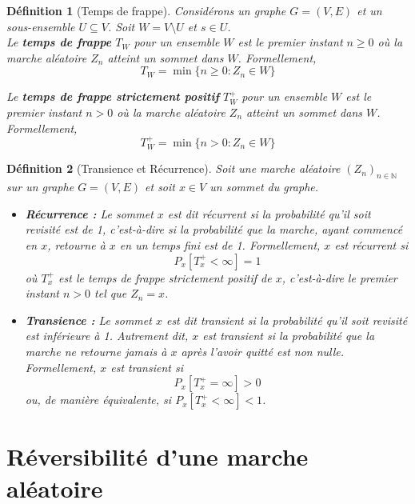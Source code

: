 \documentclass{article}
\theoremstyle{pasdepoint}
\newtheorem{definition}{Définition}
\theoremstyle{break}
\theoremstyle{pasdepoint}
\begin{document}
\begin{definition}[Temps de frappe]
    Considérons un graphe \( G = (V, E) \) et un sous-ensemble \( U \subseteq V \). Soit \( W = V \setminus U \) et \( s \in U \).\\

    Le \textbf{temps de frappe} \( T_W \) pour un ensemble \( W \) est le premier instant \( n \geq 0 \) où la marche aléatoire \( Z_n \) atteint un sommet dans \( W \). Formellement, 
    \[
    T_W = \min\{n \geq 0 : Z_n \in W\}
    \]

    Le \textbf{temps de frappe strictement positif} \(T_W^+\) pour un ensemble \( W \) est le premier instant \( n > 0 \) où la marche aléatoire \( Z_n \) atteint un sommet dans \( W \). Formellement,
    \[
    T_W^+ = \min\{n > 0 : Z_n \in W\}
    \]
\end{definition}

\begin{definition}[Transience et Récurrence]
    Soit une marche aléatoire \( (Z_n)_{n \in \mathbb{N}} \) sur un graphe \( G = (V, E) \) et soit \( x \in V \) un sommet du graphe. 
    
    \begin{itemize}
        \item \textbf{Récurrence :} Le sommet \( x \) est dit \textit{récurrent} si la probabilité qu'il soit revisité est de 1, c'est-à-dire si la probabilité que la marche, ayant commencé en \( x \), retourne à \( x \) en un temps fini est de 1. Formellement, \( x \) est récurrent si
        \[
        P_x[T_x^+ < \infty] = 1
        \]
        où \( T_x^+ \) est le temps de frappe strictement positif de \( x \), c'est-à-dire le premier instant \( n > 0 \) tel que \( Z_n = x \).
    
        \item \textbf{Transience :} Le sommet \( x \) est dit \textit{transient} si la probabilité qu'il soit revisité est inférieure à 1. Autrement dit, \( x \) est transient si la probabilité que la marche ne retourne jamais à \( x \) après l'avoir quitté est non nulle. Formellement, \( x \) est transient si
        \[
        P_x[T_x^+ = \infty] > 0
        \]
        ou, de manière équivalente, si \( P_x[T_x^+ < \infty] < 1 \).
    \end{itemize}
\end{definition}

\section{Réversibilité d'une marche aléatoire}
\end{document}
